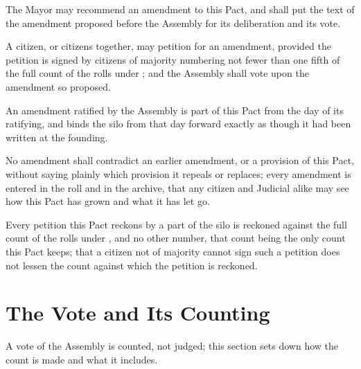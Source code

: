 \begin{clauses}
\item The Mayor may recommend an amendment to this Pact, and shall put the text of the amendment proposed before the Assembly for its deliberation and its vote.
\item A citizen, or citizens together, may petition for an amendment, provided the petition is signed by citizens of majority numbering not fewer than one fifth of the full count of the rolls under ; and the Assembly shall vote upon the amendment so proposed.
\item An amendment ratified by the Assembly is part of this Pact from the day of its ratifying, and binds the silo from that day forward exactly as though it had been written at the founding.
\item No amendment shall contradict an earlier amendment, or a provision of this Pact, without saying plainly which provision it repeals or replaces; every amendment is entered in the roll and in the archive, that any citizen and Judicial alike may see how this Pact has grown and what it has let go.
\item Every petition this Pact reckons by a part of the silo is reckoned against the full count of the rolls under , and no other number, that count being the only count this Pact keeps; that a citizen not of majority cannot sign such a petition does not lessen the count against which the petition is reckoned.
\end{clauses}

\section{The Vote and Its Counting}
\label{sec:assembly:vote-and-its-counting}

A vote of the Assembly is counted, not judged; this section sets down how the count is made and what it includes.

